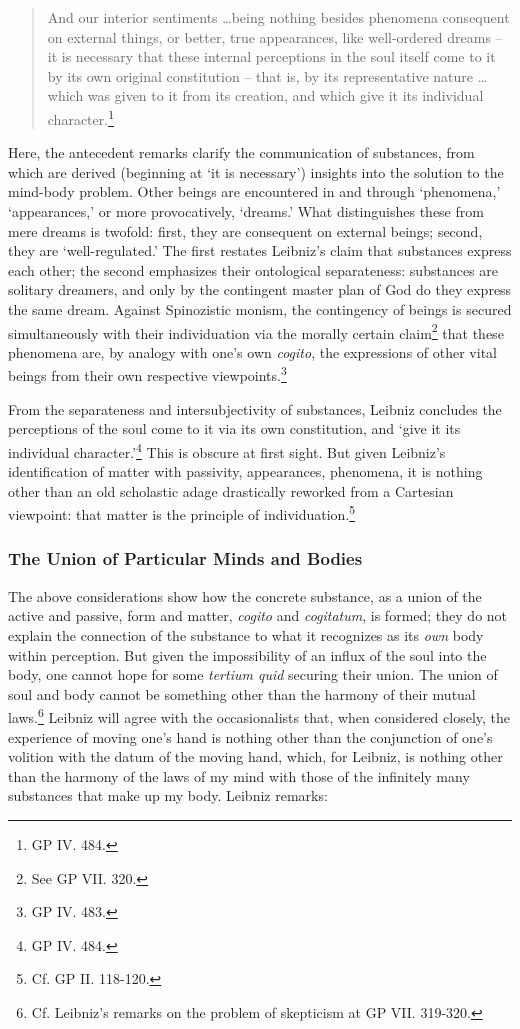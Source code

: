 \documentclass{article}
\begin{document}
\begin{quote}
And our interior sentiments \ldots being nothing besides
phenomena consequent on external things, or better, true appearances,
like well-ordered dreams -- it is necessary that these internal
perceptions in the soul itself come to it by its own original
constitution -- that is, by its representative nature \ldots
which was given to it from its creation, and which give it its
individual character.\footnote{GP IV. 484.}
\end{quote}

Here, the antecedent remarks clarify the communication of substances,
from which are derived (beginning at `it is necessary') insights into
the solution to the mind-body problem. Other beings are encountered in
and through `phenomena,' `appearances,' or more provocatively, `dreams.'
What distinguishes these from mere dreams is twofold: first, they are
consequent on external beings; second, they are `well-regulated.' The
first restates Leibniz's claim that substances express each other; the
second emphasizes their ontological separateness: substances are
solitary dreamers, and only by the contingent master plan of God do they
express the same dream. Against Spinozistic monism, the contingency of
beings is secured simultaneously with their individuation via the
morally certain claim\footnote{See GP VII. 320.} that these phenomena
are, by analogy with one's own \emph{cogito}, the expressions of other
vital beings from their own respective viewpoints.\footnote{GP IV. 483.}

From the separateness and intersubjectivity of substances, Leibniz
concludes the perceptions of the soul come to it via its own
constitution, and `give it its individual character.'\footnote{GP IV.
  484.} This is obscure at first sight. But given Leibniz's
identification of matter with passivity, appearances, phenomena, it is
nothing other than an old scholastic adage drastically reworked from a
Cartesian viewpoint: that matter is the principle of
individuation.\footnote{Cf. GP II. 118-120.}

\subsubsection{The Union of Particular Minds and
Bodies}

The above considerations show how the concrete substance, as a union of
the active and passive, form and matter, \emph{cogito} and
\emph{cogitatum}, is formed; they do not explain the connection of the
substance to what it recognizes as its \emph{own} body within
perception. But given the impossibility of an influx of the soul into
the body, one cannot hope for some \emph{tertium quid} securing their
union. The union of soul and body cannot be something other than the
harmony of their mutual laws.\footnote{Cf. Leibniz's remarks on the
  problem of skepticism at GP VII. 319-320.} Leibniz will agree with the
occasionalists that, when considered closely, the experience of moving
one's hand is nothing other than the conjunction of one's volition with
the datum of the moving hand, which, for Leibniz, is nothing other than
the harmony of the laws of my mind with those of the infinitely many
substances that make up my body. Leibniz remarks:
\end{document}
